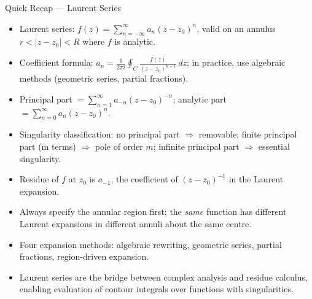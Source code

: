 \documentclass[12pt,a4paper]{article}
\begin{document}
\begin{learnbox}{Quick Recap --- Laurent Series}
\begin{itemize}
  \item Laurent series: $f(z)=\sum_{n=-\infty}^{\infty}a_n(z-z_0)^n$, valid on an annulus
        $r<|z-z_0|<R$ where $f$ is analytic.
  \item Coefficient formula: $a_n = \frac{1}{2\pi i}\oint_C \frac{f(z)}{(z-z_0)^{n+1}}\,dz$;
        in practice, use algebraic methods (geometric series, partial fractions).
  \item Principal part $= \sum_{n=1}^{\infty} a_{-n}(z-z_0)^{-n}$; analytic part $= \sum_{n=0}^{\infty} a_n(z-z_0)^n$.
  \item Singularity classification: no principal part $\Rightarrow$ removable; finite principal part (m terms) $\Rightarrow$ pole of order $m$; infinite principal part $\Rightarrow$ essential singularity.
  \item Residue of $f$ at $z_0$ is $a_{-1}$, the coefficient of $(z-z_0)^{-1}$ in the Laurent expansion.
  \item Always specify the annular region first; the \emph{same} function has different Laurent expansions in different annuli about the same centre.
  \item Four expansion methods: algebraic rewriting, geometric series, partial fractions, region-driven expansion.
  \item Laurent series are the bridge between complex analysis and residue calculus, enabling evaluation of contour integrals over functions with singularities.
\end{itemize}
\end{learnbox}
\end{document}
